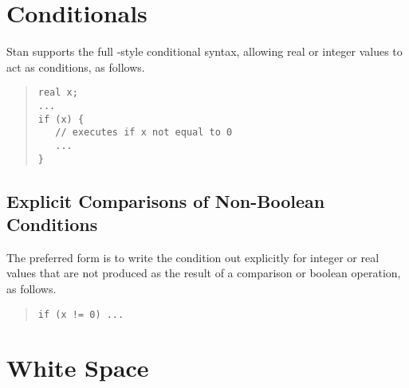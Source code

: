 \section{Conditionals}

Stan supports the full \Cpp-style conditional syntax,
allowing real or integer values to act as conditions, as follows.
%
\begin{quote}
\begin{Verbatim}
real x;
...
if (x) {
   // executes if x not equal to 0
   ...
}
\end{Verbatim}
\end{quote}
%

\subsection{Explicit Comparisons of Non-Boolean Conditions}

The preferred form is to write the condition out explicitly for
integer or real values that are not produced as the result of a
comparison or boolean operation, as follows.
%
\begin{quote}
\begin{Verbatim}
if (x != 0) ...
\end{Verbatim}
\end{quote}



\section{White Space}

